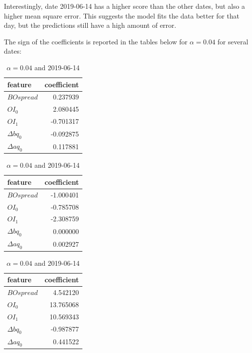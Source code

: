 \documentclass[english, 11pt, a4paper]{article}
\begin{document}
Interestingly, date 2019-06-14 has a higher score than the other dates, but also a higher mean
square error. This suggests the model fits the data better for that day, but the predictions still
have a high amount of error. 

The sign of the coefficients is reported in the tables below for $\alpha = 0.04$ for several dates:

\begin{table}[H]
  \centering
  \begin{minipage}{.25\textwidth}
    \centering
      \begin{tabular}{lr}
      \toprule
      feature & coefficient \\
      \midrule
      $BOspread$ & 0.237939 \\
      $OI_0$ & 2.080445 \\
      $OI_1$ & -0.701317 \\
      $\Delta bq_{0}$ & -0.092875 \\
      $\Delta aq_{0}$ & 0.117881 \\
      \bottomrule
      \end{tabular}
  \caption{ $\alpha = 0.04$ and 2019-06-10}
  \end{minipage}
    \hspace{1cm}
  \begin{minipage}{.25\textwidth}
    \centering
  \begin{tabular}{lr}
  \toprule
  feature & coefficient \\
  \midrule
  $BOspread$ & -1.000401 \\
  $OI_0$ & -0.785708 \\
  $OI_1$ & -2.308759 \\
  $\Delta bq_{0}$ & 0.000000 \\
  $\Delta aq_{0}$ & 0.002927 \\
  \bottomrule
  \end{tabular}
  \caption{ $\alpha = 0.04$ and 2019-06-12}
  \end{minipage}
    \hspace{1cm}
  \begin{minipage}{.25\textwidth}
    \centering
    \begin{tabular}{lr}
    \toprule
    feature & coefficient \\
    \midrule
    $BOspread$ & 4.542120 \\
    $OI_0$ & 13.765068 \\
    $OI_1$ & 10.569343 \\
    $\Delta bq_0$ & -0.987877 \\
    $\Delta aq_0$ & 0.441522 \\
    \bottomrule
    \end{tabular}
    \caption{ $\alpha = 0.04$ and 2019-06-14}
  \end{minipage}
\end{table}
\end{document}
